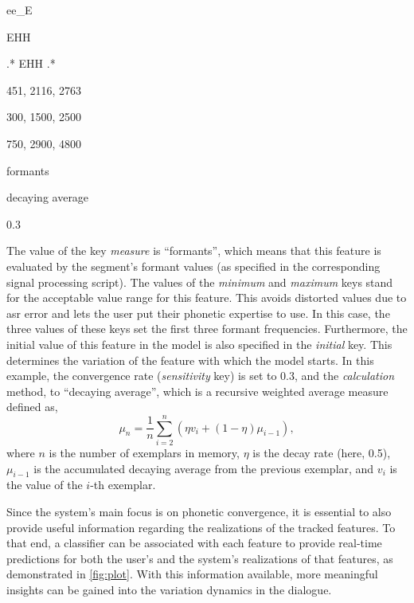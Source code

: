 \begin{description}[labelindent=1.5cm, labelwidth=\widthof{\quad \bfseries calculation}]
	\item[name]	ee\_E
	\item[phoneme] EHH
	\item[context] .* EHH .*
	\item[initial] 451, 2116, 2763
	\item[minimum] 300, 1500, 2500
	\item[maximum] 750, 2900, 4800
	\item[measure] formants
	\item[calculation] decaying average
	\item[sensitivity] 0.3
\end{description}
%
The value of the key \emph{measure} is \enquote{formants}, which means that this feature is evaluated by the segment's formant values (as specified in the corresponding signal processing script).
The values of the \emph{minimum} and \emph{maximum} keys stand for the acceptable value range for this feature.
This avoids distorted values due to \ac{asr} error and lets the user put their phonetic expertise to use.
In this case, the three values of these keys set the first three formant frequencies.
Furthermore, the initial value of this feature in the model is also specified in the \emph{initial} key.
This determines the variation of the feature with which the model starts.
In this example, the convergence rate (\emph{sensitivity} key) is set to 0.3, and the \emph{calculation} method, to \enquote{decaying average}, which is a recursive weighted average measure defined as,
%
\begin{equation} 
	\label{eq:decaying_average} 
	\mu_n = \frac{1}{n}\sum_{i = 2}^{n}(\eta v_i + (1 - \eta )\mu_{i-1}), 
\end{equation} 
%
where $n$ is the number of exemplars in memory, $\eta$ is the decay rate (here, 0.5), $\mu_{i-1}$ is the accumulated decaying average from the previous exemplar, and $v_i$ is the value of the $i$-th exemplar. 

Since the system's main focus is on phonetic convergence, it is essential to also provide useful information regarding the realizations of the tracked features.
To that end, a classifier can be associated with each feature to provide real-time predictions for both the user's and the system's realizations of that features, as demonstrated in \cref{fig:plot}.
With this information available, more meaningful insights can be gained into the variation dynamics in the dialogue.

